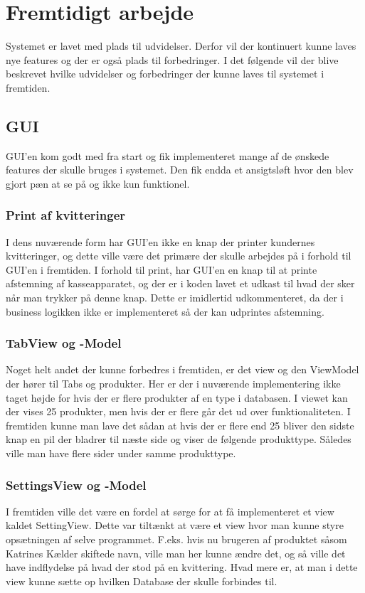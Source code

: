 \section{Fremtidigt arbejde}
Systemet er lavet med plads til udvidelser. Derfor vil der kontinuert kunne laves nye features og der er også plads til forbedringer. I det følgende vil der blive beskrevet hvilke udvidelser og forbedringer der kunne laves til systemet i fremtiden. 

\subsection{GUI}
GUI'en kom godt med fra start og fik implementeret mange af de ønskede features der skulle bruges i systemet. Den fik endda et ansigtsløft hvor den blev gjort pæn at se på og ikke kun funktionel.\newline 
\subsubsection{Print af kvitteringer}
I dens nuværende form har GUI'en ikke en knap der printer kundernes kvitteringer, og dette ville være det primære der skulle arbejdes på i forhold til GUI'en i fremtiden. I forhold til print, har GUI'en en knap til at printe afstemning af kasseapparatet, og der er i koden lavet et udkast til hvad der sker når man trykker på denne knap. Dette er imidlertid udkommenteret, da der i business logikken ikke er implementeret så der kan udprintes afstemning.\newline
\subsubsection{TabView og -Model}
Noget helt andet der kunne forbedres i fremtiden, er det view og den ViewModel der hører til Tabs og produkter. Her er der i nuværende implementering ikke taget højde for hvis der er flere produkter af en type i databasen. I viewet kan der vises 25 produkter, men hvis der er flere går det ud over funktionaliteten. I fremtiden kunne man lave det sådan at hvis der er flere end 25 bliver den sidste knap en pil der bladrer til næste side og viser de følgende produkttype. Således ville man have flere sider under samme produkttype.\newline
\subsubsection{SettingsView og -Model}
I fremtiden ville det være en fordel at sørge for at få implementeret et view kaldet SettingView. Dette var tiltænkt at være et view hvor man kunne styre opsætningen af selve programmet. F.eks. hvis nu brugeren af produktet såsom Katrines Kælder skiftede navn, ville man her kunne ændre det, og så ville det have indflydelse på hvad der stod på en kvittering. Hvad mere er, at man i dette view kunne sætte op hvilken Database der skulle forbindes til. 

